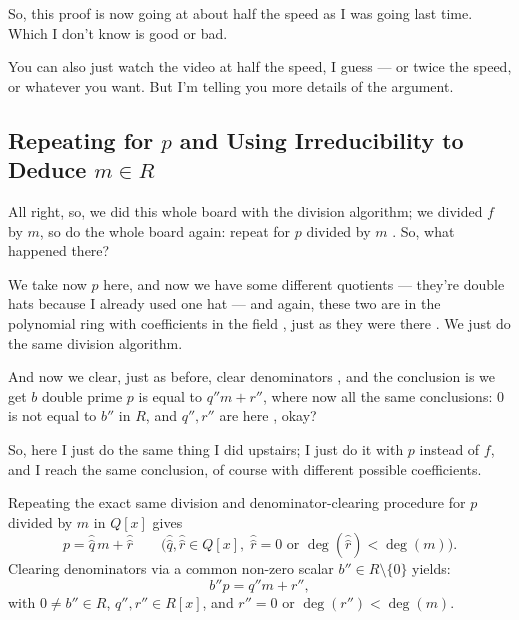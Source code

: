 \begin{proofWrapper}
\begin{speech}[00:28:07 - 00:29:05]
So, this proof is now going at about half the speed as I was going last time. Which I don't know is good or bad. 

You can also just watch the video at half the speed, I guess --- or twice the speed, or whatever you want. But I'm telling you more details of the argument.
\end{speech}

\subsection{Repeating for \texorpdfstring{$p$}{p} and Using Irreducibility to Deduce \texorpdfstring{$m \in R$}{m in R}}

\begin{speech}[00:29:05 - 00:30:33]
All right, so, we did this whole board with the division algorithm; we divided $f$ by $m$, so do the whole board again: repeat for $p$ divided by $m$ . So, what happened there?

We take now $p$ here, and now we have some different quotients --- they're double hats because I already used one hat  --- and again, these two are in the polynomial ring with coefficients in the field , just as they were there . We just do the same division algorithm.

And now we clear, just as before, clear denominators , and the conclusion is we get $b$ double prime $p$ is equal to $q'' m + r''$, where now all the same conclusions: $0$ is not equal to $b''$ in $R$, and $q'', r''$ are here , okay?

So, here I just do the same thing I did upstairs; I just do it with $p$ instead of $f$, and I reach the same conclusion, of course with different possible coefficients.
\end{speech}

\begin{content}
Repeating the exact same division and denominator-clearing procedure for $p$ divided by $m$ in $Q[x]$ gives
\[
p = \hat{\hat{q}}\, m + \hat{\hat{r}} \qquad \bigl(\hat{\hat{q}}, \hat{\hat{r}} \in Q[x], \; \hat{\hat{r}} = 0 \text{ or } \deg(\hat{\hat{r}}) < \deg(m)\bigr).
\]
Clearing denominators via a common non-zero scalar $b'' \in R \setminus \{0\}$ yields:
\begin{equation}\label{eq:cleared-p}
b'' p = q'' m + r'',
\end{equation}
with $0 \neq b'' \in R$, $q'', r'' \in R[x]$, and $r'' = 0$ or $\deg(r'') < \deg(m)$.
\end{content}


\end{proofWrapper}
